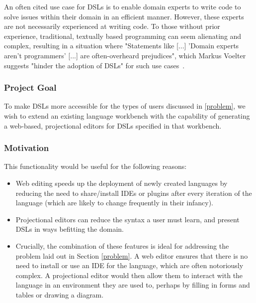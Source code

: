 \documentclass{article}
\begin{document}
An often cited use case for DSLs is to enable domain experts to write code to solve issues within their domain in an efficient manner. However, these experts are not necessarily experienced at writing code. To those without prior experience, traditional, textually based programming can seem alienating and complex, resulting in a situation where "Statements like [...] 'Domain experts aren't programmers' [...] are often-overheard prejudices", which Markus Voelter suggests "hinder the adoption of DSLs" for such use cases~\cite[pg.45]{dslEngineering}.

\subsubsection{Project Goal}\label{goal}
To make DSLs more accessible for the types of users discussed in \ref{problem}, we wish to extend an existing language workbench with the capability of generating a web-based, projectional editors for DSLs specified in that workbench. 

\subsubsection{Motivation}\label{motivation}
This functionality would be useful for the following reasons:
\begin{itemize}
\item Web editing speeds up the deployment of newly created languages by reducing the need to share/install IDEs or plugins after every iteration of the language (which are likely to change frequently in their infancy). 
\item Projectional editors can reduce the syntax a user must learn, and present DSLs in ways befitting the domain.
\item Crucially, the combination of these features is ideal for addressing the problem laid out in Section \ref{problem}. A web editor ensures that there is no need to install or use an IDE for the language, which are often notoriously complex. A projectional editor would then allow them to interact with the language in an environment they are used to, perhaps by filling in forms and tables or drawing a diagram.  
\end{itemize} 
\end{document}
